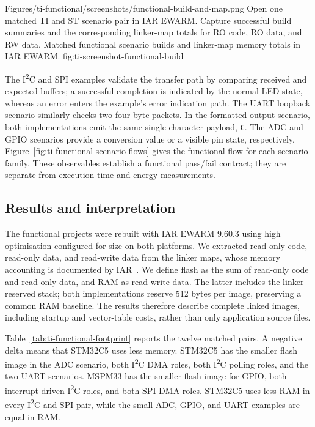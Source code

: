 \reportscreenshot
      {Figures/ti-functional/screenshots/functional-build-and-map.png}
      {Open one matched TI and ST scenario pair in IAR EWARM. Capture successful build summaries and the corresponding linker-map totals for RO code, RO data, and RW data.}
      {Matched functional scenario builds and linker-map memory totals in IAR EWARM.}
      {fig:ti-screenshot-functional-build}

The I\textsuperscript{2}C and SPI examples validate the transfer path by comparing received
and expected buffers; a successful completion is indicated by the normal LED state, whereas an
error enters the example's error indication path. The UART loopback scenario similarly checks
two four-byte packets. In the formatted-output scenario, both implementations emit the same
single-character payload, \texttt{C}. The ADC and GPIO scenarios provide a conversion value or
a visible pin state, respectively. Figure~\ref{fig:ti-functional-scenario-flows} gives the
functional flow for each scenario family. These observables establish a functional pass/fail
contract; they are separate from execution-time and energy measurements.

\subsection{Results and interpretation}
\label{subsec:ti-functional-results}

The functional projects were rebuilt with IAR EWARM 9.60.3 using high optimisation configured
for size on both platforms. We extracted read-only code, read-only data, and read-write data
from the linker maps, whose memory accounting is documented by IAR~\cite{iar-ewarm}. We define
flash as the sum of read-only code and read-only data, and RAM as read-write data. The latter
includes the linker-reserved stack; both implementations reserve 512 bytes per image,
preserving a common RAM baseline. The results therefore describe complete linked images,
including startup and vector-table costs, rather than only application source files.

Table~\ref{tab:ti-functional-footprint} reports the twelve matched pairs. A negative delta
means that STM32C5 uses less memory. STM32C5 has the smaller flash image in the ADC scenario,
both I\textsuperscript{2}C DMA roles, both I\textsuperscript{2}C polling roles, and the two
UART scenarios. MSPM33 has the smaller flash image for GPIO, both interrupt-driven I\textsuperscript{2}C
roles, and both SPI DMA roles. STM32C5 uses less RAM in every I\textsuperscript{2}C and SPI
pair, while the small ADC, GPIO, and UART examples are equal in RAM.

